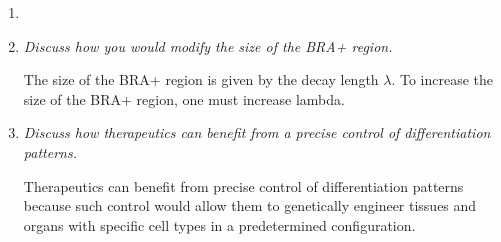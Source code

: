 \documentclass{article} %
\begin{document}
\begin{enumerate}
\item
\item \textit{Discuss how you would modify the size of the BRA+ region.}


  The size of the BRA+ region is given by the decay length $\lambda$. To increase the size of the BRA+ region, one must increase lambda.
  
\item \textit{Discuss how therapeutics can benefit from a precise control of differentiation patterns.}

  Therapeutics can benefit from precise control of differentiation patterns because such control would allow them to genetically engineer tissues and organs with specific cell types in a predetermined configuration.
\end{enumerate}

\end{document}
